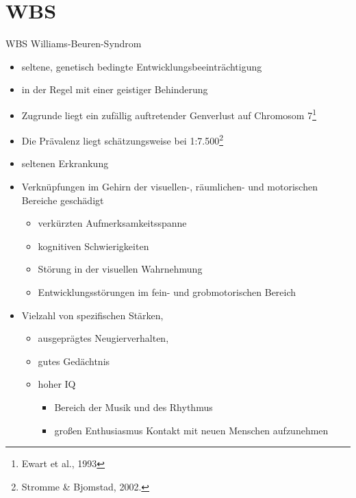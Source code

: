 \documentclass[10pt,fleqn]{beamer}
\begin{document}
\section{WBS}
\begin{frame}[t]{WBS Williams-Beuren-Syndrom}
	\begin{itemize}
		\item seltene, genetisch bedingte Entwicklungsbeeinträchtigung
		\item in der Regel mit einer geistiger Behinderung
		\item Zugrunde liegt ein zufällig auftretender Genverlust auf Chromosom 7\footnote{Ewart et al., 1993} 
		\item Die Prävalenz liegt schätzungsweise bei 1:7.500\footnote{Stromme \& Bjomstad, 2002.}
		\item seltenen Erkrankung
		\item Verknüpfungen im Gehirn der visuellen-, räumlichen- und motorischen Bereiche geschädigt
		\begin{itemize}
			\item verkürzten Aufmerksamkeitsspanne
			\item kognitiven Schwierigkeiten
			\item Störung in der visuellen Wahrnehmung
			\item Entwicklungsstörungen im fein- und grobmotorischen Bereich
		\end{itemize}
		\item Vielzahl von spezifischen Stärken,
		\begin{itemize}
			\item ausgeprägtes Neugierverhalten,
			\item gutes Gedächtnis
			\item hoher IQ
			\begin{itemize}
				\item Bereich der Musik und des Rhythmus
				\item großen Enthusiasmus Kontakt mit neuen Menschen aufzunehmen
			\end{itemize} 
		\end{itemize} 
	\end{itemize}
\end{frame}
\end{document}
